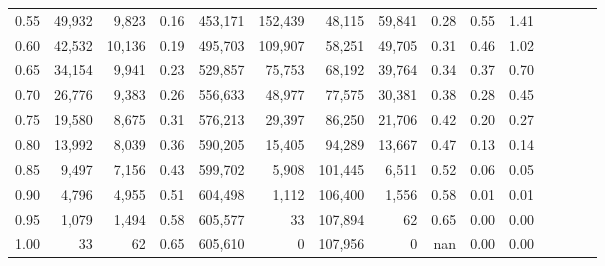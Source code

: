 \begin{tabular}{rrrcrrrrrrrrrrr}
0.55 &  49,932 &   9,823 &                                       0.16 &  453,171 &  152,439 &   48,115 &   59,841 &  0.28 &  0.55 &                         1.41 \\
0.60 &  42,532 &  10,136 &                                       0.19 &  495,703 &  109,907 &   58,251 &   49,705 &  0.31 &  0.46 &                         1.02 \\
0.65 &  34,154 &   9,941 &                                       0.23 &  529,857 &   75,753 &   68,192 &   39,764 &  0.34 &  0.37 &                         0.70 \\
0.70 &  26,776 &   9,383 &                                       0.26 &  556,633 &   48,977 &   77,575 &   30,381 &  0.38 &  0.28 &                         0.45 \\
0.75 &  19,580 &   8,675 &                                       0.31 &  576,213 &   29,397 &   86,250 &   21,706 &  0.42 &  0.20 &                         0.27 \\
0.80 &  13,992 &   8,039 &                                       0.36 &  590,205 &   15,405 &   94,289 &   13,667 &  0.47 &  0.13 &                         0.14 \\
0.85 &   9,497 &   7,156 &                                       0.43 &  599,702 &    5,908 &  101,445 &    6,511 &  0.52 &  0.06 &                         0.05 \\
0.90 &   4,796 &   4,955 &                                       0.51 &  604,498 &    1,112 &  106,400 &    1,556 &  0.58 &  0.01 &                         0.01 \\
0.95 &   1,079 &   1,494 &                                       0.58 &  605,577 &       33 &  107,894 &       62 &  0.65 &  0.00 &                         0.00 \\
1.00 &      33 &      62 &                                       0.65 &  605,610 &        0 &  107,956 &        0 &   nan &  0.00 &                         0.00 \\
\bottomrule
\end{tabular}
